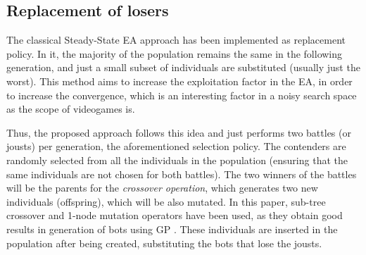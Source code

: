 \documentclass[conference]{IEEEtran}
\begin{document}
\subsection{Replacement of losers}
\label{subsec:replacement}



The classical Steady-State EA approach \cite{Genitor_whitley} has been implemented as replacement policy. In it, the majority of the population remains the same in the following generation, and just a small subset of individuals are substituted (usually just the worst). This method aims to increase the exploitation factor in the EA, in order to increase the convergence, which is an interesting factor in a noisy search space as the scope of videogames is.



Thus, the proposed approach follows this idea and just performs two battles (or jousts) per generation, the aforementioned selection policy. The contenders are randomly selected from all the individuals in the population (ensuring that the same individuals are not chosen for both battles).
The two winners of the battles will be the parents for the \textit{crossover operation}, which generates two new individuals (offspring), which will be also mutated.
In this paper, sub-tree crossover and 1-node mutation operators have been used, as they obtain good results in generation of bots using GP \cite{Esparcia2013GPunreal}.
These individuals are inserted in the population after being created, substituting the bots that lose the jousts.
\end{document}
